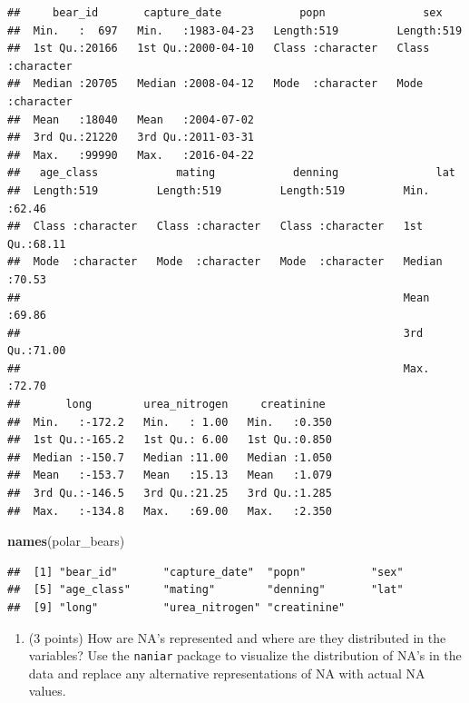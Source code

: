 \documentclass[
]{article}
\newenvironment{Shaded}{\begin{snugshade}}{\end{snugshade}}
\newcommand{\FunctionTok}[1]{\textcolor[rgb]{0.13,0.29,0.53}{\textbf{#1}}}
\newcommand{\NormalTok}[1]{#1}
\providecommand{\tightlist}{%
  \setlength{\itemsep}{0pt}\setlength{\parskip}{0pt}}
\begin{document}
\begin{verbatim}
##     bear_id       capture_date            popn               sex           
##  Min.   :  697   Min.   :1983-04-23   Length:519         Length:519        
##  1st Qu.:20166   1st Qu.:2000-04-10   Class :character   Class :character  
##  Median :20705   Median :2008-04-12   Mode  :character   Mode  :character  
##  Mean   :18040   Mean   :2004-07-02                                        
##  3rd Qu.:21220   3rd Qu.:2011-03-31                                        
##  Max.   :99990   Max.   :2016-04-22                                        
##   age_class            mating            denning               lat       
##  Length:519         Length:519         Length:519         Min.   :62.46  
##  Class :character   Class :character   Class :character   1st Qu.:68.11  
##  Mode  :character   Mode  :character   Mode  :character   Median :70.53  
##                                                           Mean   :69.86  
##                                                           3rd Qu.:71.00  
##                                                           Max.   :72.70  
##       long        urea_nitrogen     creatinine   
##  Min.   :-172.2   Min.   : 1.00   Min.   :0.350  
##  1st Qu.:-165.2   1st Qu.: 6.00   1st Qu.:0.850  
##  Median :-150.7   Median :11.00   Median :1.050  
##  Mean   :-153.7   Mean   :15.13   Mean   :1.079  
##  3rd Qu.:-146.5   3rd Qu.:21.25   3rd Qu.:1.285  
##  Max.   :-134.8   Max.   :69.00   Max.   :2.350
\end{verbatim}

\begin{Shaded}
\begin{Highlighting}[]
\FunctionTok{names}\NormalTok{(polar\_bears)}
\end{Highlighting}
\end{Shaded}

\begin{verbatim}
##  [1] "bear_id"       "capture_date"  "popn"          "sex"          
##  [5] "age_class"     "mating"        "denning"       "lat"          
##  [9] "long"          "urea_nitrogen" "creatinine"
\end{verbatim}

\begin{enumerate}
\def\labelenumi{\arabic{enumi}.}
\setcounter{enumi}{1}
\tightlist
\item
  (3 points) How are NA's represented and where are they distributed in
  the variables? Use the \texttt{naniar} package to visualize the
  distribution of NA's in the data and replace any alternative
  representations of NA with actual NA values.
\end{enumerate}
\end{document}
